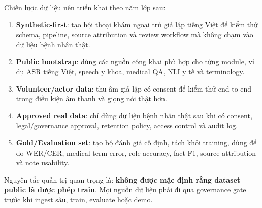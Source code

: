 \documentclass[12pt,a4paper]{article}
\begin{document}
Chiến lược dữ liệu nên triển khai theo năm lớp sau:

\begin{enumerate}
    \item \textbf{Synthetic-first}: tạo hội thoại khám ngoại trú giả lập tiếng Việt để kiểm thử schema, pipeline, source attribution và review workflow mà không chạm vào dữ liệu bệnh nhân thật.
    \item \textbf{Public bootstrap}: dùng các nguồn công khai phù hợp cho từng module, ví dụ ASR tiếng Việt, speech y khoa, medical QA, NLI y tế và terminology.
    \item \textbf{Volunteer/actor data}: thu âm giả lập có consent để kiểm thử end-to-end trong điều kiện âm thanh và giọng nói thật hơn.
    \item \textbf{Approved real data}: chỉ dùng dữ liệu bệnh nhân thật sau khi có consent, legal/governance approval, retention policy, access control và audit log.
    \item \textbf{Gold/Evaluation set}: tạo bộ đánh giá cố định, tách khỏi training, dùng để đo WER/CER, medical term error, role accuracy, fact F1, source attribution và note usability.
\end{enumerate}

Nguyên tắc quản trị quan trọng là: \textbf{không được mặc định rằng dataset public là được phép train}. Mọi nguồn dữ liệu phải đi qua governance gate trước khi ingest sâu, train, evaluate hoặc demo.
\end{document}
